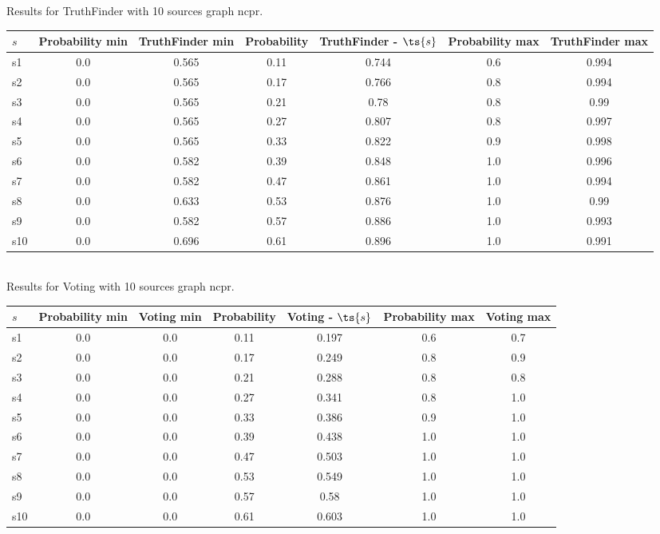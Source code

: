 \documentclass{article}
\begin{document}
\noindent Results for TruthFinder with 10 sources graph ncpr.

\noindent\begin{tabular}{|l|c|c|c|c|c|c|}
\hline
$s$& Probability min & TruthFinder min & Probability & TruthFinder - $\ts{s}$ & Probability max & TruthFinder max\\
\hline
s1 &0.0 & 0.565 & 0.11 & 0.744 & 0.6 & 0.994\\
\hline
s2 &0.0 & 0.565 & 0.17 & 0.766 & 0.8 & 0.994\\
\hline
s3 &0.0 & 0.565 & 0.21 & 0.78 & 0.8 & 0.99\\
\hline
s4 &0.0 & 0.565 & 0.27 & 0.807 & 0.8 & 0.997\\
\hline
s5 &0.0 & 0.565 & 0.33 & 0.822 & 0.9 & 0.998\\
\hline
s6 &0.0 & 0.582 & 0.39 & 0.848 & 1.0 & 0.996\\
\hline
s7 &0.0 & 0.582 & 0.47 & 0.861 & 1.0 & 0.994\\
\hline
s8 &0.0 & 0.633 & 0.53 & 0.876 & 1.0 & 0.99\\
\hline
s9 &0.0 & 0.582 & 0.57 & 0.886 & 1.0 & 0.993\\
\hline
s10 &0.0 & 0.696 & 0.61 & 0.896 & 1.0 & 0.991\\
\hline
\end{tabular}\\

\noindent Results for Voting with 10 sources graph ncpr.

\noindent\begin{tabular}{|l|c|c|c|c|c|c|}
\hline
$s$& Probability min & Voting min & Probability & Voting - $\ts{s}$ & Probability max & Voting max\\
\hline
s1 &0.0 & 0.0 & 0.11 & 0.197 & 0.6 & 0.7\\
\hline
s2 &0.0 & 0.0 & 0.17 & 0.249 & 0.8 & 0.9\\
\hline
s3 &0.0 & 0.0 & 0.21 & 0.288 & 0.8 & 0.8\\
\hline
s4 &0.0 & 0.0 & 0.27 & 0.341 & 0.8 & 1.0\\
\hline
s5 &0.0 & 0.0 & 0.33 & 0.386 & 0.9 & 1.0\\
\hline
s6 &0.0 & 0.0 & 0.39 & 0.438 & 1.0 & 1.0\\
\hline
s7 &0.0 & 0.0 & 0.47 & 0.503 & 1.0 & 1.0\\
\hline
s8 &0.0 & 0.0 & 0.53 & 0.549 & 1.0 & 1.0\\
\hline
s9 &0.0 & 0.0 & 0.57 & 0.58 & 1.0 & 1.0\\
\hline
s10 &0.0 & 0.0 & 0.61 & 0.603 & 1.0 & 1.0\\
\hline
\end{tabular}\\
\end{document}
